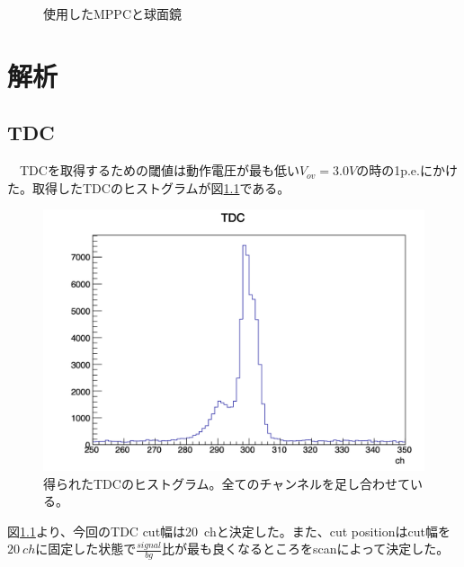 \documentclass[uplatex, titlepage, dvipdfmx, 12pt, a4paper]{jsreport}
\begin{document}
\begin{figure}[htbp]
\begin{center}
\begin{tabular}{c}
    \end{tabular}
    \caption{使用したMPPCと球面鏡}
    \label{fig:MPPC'N'mirror}
  \end{center}
\end{figure}


\chapter{解析}
  \section{TDC}
  　TDCを取得するための閾値は動作電圧が最も低い$V_{ov}=3.0V$の時の1p.e.にかけた。取得したTDCのヒストグラムが図\ref{fig:tdc}である。
  \begin{figure}[htbp]
    \begin{center} 
      \includegraphics[clip, scale=0.2]{image/tdc.png}
      \caption{得られたTDCのヒストグラム。全てのチャンネルを足し合わせている。}
      \label{fig:tdc} 
    \end{center}
  \end{figure}
  図\ref{fig:tdc}より、今回のTDC cut幅は\SI{20}{ch}と決定した。また、cut positionはcut幅を$20\:\si{ch}$に固定した状態で$\frac{signal}{bg}$比が最も良くなるところをscanによって決定した。
\end{document}

